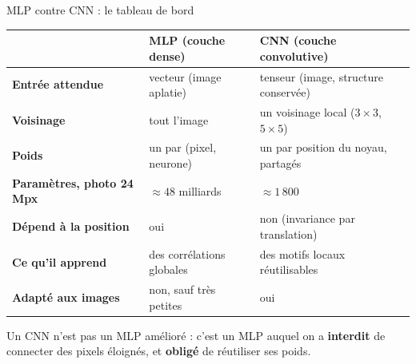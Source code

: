 
\begin{frame}{MLP contre CNN : le tableau de bord}
\begin{center}
\small
\begin{tabular}{@{}p{}p{}p{}@{}}
\toprule
 & \textbf{MLP (couche dense)} & \textbf{CNN (couche convolutive)} \\
\midrule
\textbf{Entrée attendue} & vecteur (image aplatie) & tenseur (image, structure conservée) \\
\textbf{Voisinage} & tout l'image & un voisinage local ($3 \times 3$, $5 \times 5$) \\
\textbf{Poids} & un par (pixel, neurone) & un par position du noyau, partagés \\
\textbf{Paramètres, photo 24 Mpx} & $\approx 48$ milliards & $\approx 1\,800$ \\
\textbf{Dépend à la position} & oui & non (invariance par translation) \\
\textbf{Ce qu'il apprend} & des corrélations globales & des motifs locaux réutilisables \\
\textbf{Adapté aux images} & non, sauf très petites & oui \\
\bottomrule
\end{tabular}
\end{center}
\vspace{1mm}
\begin{kbox}
Un CNN n'est pas un MLP amélioré : c'est un MLP auquel on a \textbf{interdit}
de connecter des pixels éloignés, et \textbf{obligé} de réutiliser ses poids.
\end{kbox}
\end{frame}

